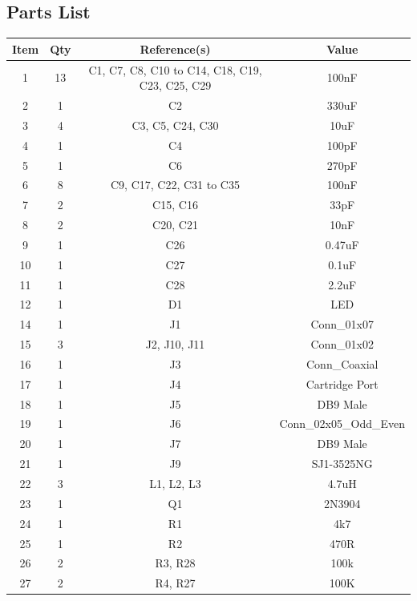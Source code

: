 \subsection{Parts List}

\begin{footnotesize}
\begin{longtable}{ |*{4}{c|} }
\hline
{Item} & {Qty} & {Reference(s)} & {Value} \\
\hline
{1} & {13} & {C1, C7, C8, C10 to C14, C18, C19, C23, C25, C29} & {100nF} \\
\hline
{2} & {1} & {C2} & {330uF} \\
\hline
{3} & {4} & {C3, C5, C24, C30} & {10uF} \\
\hline
{4} & {1} & {C4} & {100pF} \\
\hline
{5} & {1} & {C6} & {270pF} \\
\hline
{6} & {8} & {C9, C17, C22, C31 to C35} & {100nF} \\
\hline
{7} & {2} & {C15, C16} & {33pF} \\
\hline
{8} & {2} & {C20, C21} & {10nF} \\
\hline
{9} & {1} & {C26} & {0.47uF} \\
\hline
{10} & {1} & {C27} & {0.1uF} \\
\hline
{11} & {1} & {C28} & {2.2uF} \\
\hline
{12} & {1} & {D1} & {LED} \\
\hline
{14} & {1} & {J1} & {Conn\_01x07} \\
\hline
{15} & {3} & {J2, J10, J11} & {Conn\_01x02} \\
\hline
{16} & {1} & {J3} & {Conn\_Coaxial} \\
\hline
{17} & {1} & {J4} & {Cartridge Port} \\
\hline
{18} & {1} & {J5} & {DB9 Male} \\
\hline
{19} & {1} & {J6} & {Conn\_02x05\_Odd\_Even} \\
\hline
{20} & {1} & {J7} & {DB9 Male} \\
\hline
{21} & {1} & {J9} & {SJ1-3525NG} \\
\hline
{22} & {3} & {L1, L2, L3} & {4.7uH} \\
\hline
{23} & {1} & {Q1} & {2N3904} \\
\hline
{24} & {1} & {R1} & {4k7} \\
\hline
{25} & {1} & {R2} & {470R} \\
\hline
{26} & {2} & {R3, R28} & {100k} \\
\hline
{27} & {2} & {R4, R27} & {100K} \\

\end{longtable}
\end{footnotesize}
